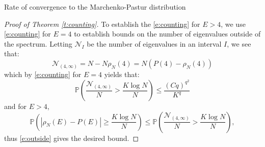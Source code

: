 \documentclass[11pt, a4paper, oneside]{book}
\numberwithin{equation}{chapter}
\newcommand{\PP}{\mathbb P}
\begin{document}
\begin{section}{Rate of convergence to the Marchenko-Pastur distribution}
\begin{proof}[Proof of Theorem \ref{t:counting}]
To establish the \eqref{e:counting} for $E > 4$, we use \eqref{e:counting} for $E = 4$ to establish bounds on the number of eigenvalues outside of the spectrum. Letting $\mathcal{N}_I$ be the number of eigenvalues in an interval $I$, we see that:
%
\begin{equation}
 \mathcal{N}_{(4, \infty)} = N - N \rho_N(4) = N(P(4) - \rho_N(4))
\end{equation}
%
which by \eqref{e:counting} for $E = 4$ yields that:
%
\begin{equation}\label{e:outside}
\PP\left(\frac{\mathcal{N}_{(4, \infty)}}{N} > \frac{K\log N}{N}\right) \leq \frac{(Cq)^{q^2}}{K^q}
\end{equation}
%
and for $E > 4$,
%
\begin{equation}
\PP\left(|\rho_N(E) - P(E)| \geq \frac{K \log N}{N}\right) \leq \PP\left(\frac{\mathcal{N}_{(4, \infty)}}{N} > \frac{K\log N}{N}\right),
\end{equation}
%
thus \eqref{e:outside} gives the desired bound.
\end{proof}

\end{section}
\end{document}
